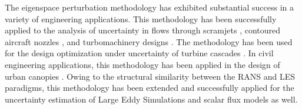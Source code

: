 The eigenspace perturbation methodology has exhibited substantial success in a variety of engineering applications. This methodology has been successfully applied to the analysis of uncertainty in flows through scramjets \cite{emory2011characterizing}, contoured aircraft nozzles \cite{aiaajets, envelopingmodels}, and turbomachinery designs \cite{emory2016uncertainty}. The methodology has been used for the design optimization under uncertainty of turbine cascades \cite{razaaly2019optimization}. In civil engineering applications, this methodology has been applied in the design of urban canopies \cite{garcia2014quantifying,ricci2015local}. Owing to the structural similarity between the RANS and LES paradigms, this methodology has been extended and successfully applied for the uncertainty estimation of Large Eddy Simulations and scalar flux models \cite{gorle2013framework} as well.

